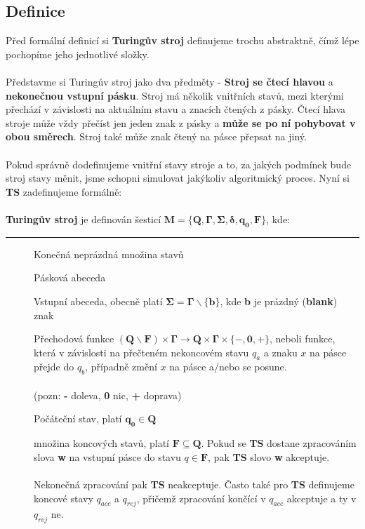 \documentclass{report}
\begin{document}
\subsection*{Definice}
Před formální definicí si \textbf{Turingův stroj} definujeme trochu abstraktně, čímž lépe pochopíme jeho jednotlivé složky.\\ \\
Představme si Turingův stroj jako dva předměty - \textbf{Stroj se čtecí hlavou} a \textbf{nekonečnou vstupní pásku}. Stroj má několik vnitřních stavů, mezi kterými přechází v závislosti na aktuálním stavu a znacích čtených z pásky. Čtecí hlava stroje může vždy přečíst jen jeden znak z pásky a \textbf{může se po ní pohybovat v obou směrech}. Stroj také může znak čtený na pásce přepsat na jiný.\\ \\
Pokud správně dodefinujeme vnitřní stavy stroje a to, za jakých podmínek bude stroj stavy měnit, jsme schopni simulovat jakýkoliv algoritmický proces. Nyní si \textbf{TS} zadefinujeme formálně:\\ \\
\textbf{Turingův stroj} je definován šesticí $\mathbf{M=\{Q,\Gamma,\Sigma,\delta,q_0,F\}}$, kde:
\vspace{0.4cm}    
\hrule
\vspace{0.1cm}
    \begin{description}
        \item[] Konečná neprázdná množina stavů
        \item[\fbox{$\mathbf{\Gamma}$}] Pásková abeceda
        \item[\fbox{$\mathbf{\Sigma}$}] Vstupní abeceda, obecně platí $\mathbf{\Sigma = \Gamma \backslash \{b\}}$, kde \textbf{b} je prázdný (\textbf{blank}) znak
        \item[\fbox{$\mathbf{\delta}$}] Přechodová funkce $\mathbf{(Q\backslash{F}) \times \Gamma \rightarrow Q \times \Gamma \times \{-,0,+\}}$, neboli funkce, která v závislosti na přečteném nekoncovém stavu $q_a$ a znaku $x$ na pásce přejde do $q_b$, případně změní $x$ na pásce a/nebo se posune.\\ \\(pozn: \textbf{-} doleva, \textbf{0} nic, \textbf{+} doprava)
        \item[] Počáteční stav, platí $\mathbf{q_0 \in Q}$
        \item[] množina koncových stavů, platí $\mathbf{F \subseteq Q}$. Pokud se \textbf{TS} dostane zpracováním slova \textbf{w} na vstupní pásce do stavu $q \in \mathbf{F}$, pak \textbf{TS} slovo \textbf{w} akceptuje.\\ \\
        Nekonečná zpracování pak \textbf{TS} neakceptuje. Často také pro \textbf{TS} definujeme koncové stavy $q_{acc}$ a $q_{rej}$, přičemž zpracování končící v $q_{acc}$ akceptuje a ty v $q_{rej}$ ne.
    \end{description}
\end{document}
